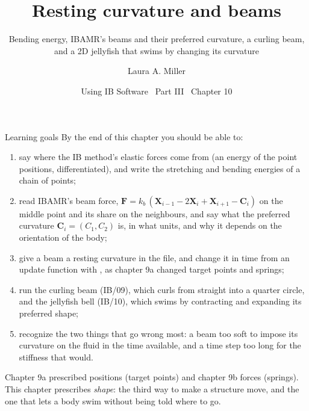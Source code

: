 \documentclass[aspectratio=169,11pt]{beamer}
\title[Resting curvature and beams]{Resting curvature and beams}
\subtitle{Bending energy, IBAMR's beams and their preferred curvature, a curling beam, and a 2D jellyfish that swims by changing its curvature}
\author[Miller]{Laura A. Miller}
\institute[UArizona]{Department of Mathematics, University of Arizona}
\date{Using IB Software \textbullet\ Part III \textbullet\ Chapter 10}
\begin{document}
\begin{frame}[plain]
\end{frame}

\begin{frame}{Learning goals}
\label{fr:goals}
\footnotesize By the end of this chapter you should be able to:
\begin{enumerate}
  \item say where the IB method's elastic forces come from (an energy of the point positions, differentiated), and write the stretching and bending energies of a chain of points;
  \item read IBAMR's beam force, $\mathbf{F} = k_b\,(\mathbf{X}_{i-1} - 2\mathbf{X}_i + \mathbf{X}_{i+1} - \mathbf{C}_i)$ on the middle point and its share on the neighbours, and say what the preferred curvature $\mathbf{C}_i = (C_1, C_2)$ is, in what units, and why it depends on the orientation of the body;
  \item give a beam a resting curvature in the  file, and change it in time from an update function with , as chapter 9a changed target points and springs;
  \item run the curling beam (IB/09), which curls from straight into a quarter circle, and the jellyfish bell (IB/10), which swims by contracting and expanding its preferred shape;
  \item recognize the two things that go wrong most: a beam too soft to impose its curvature on the fluid in the time available, and a time step too long for the stiffness that would.
\end{enumerate}
\begin{punchbox}
\footnotesize Chapter 9a prescribed positions (target points) and chapter 9b forces (springs). This chapter prescribes \emph{shape}: the third way to make a structure move, and the one that lets a body swim without being told where to go.
\end{punchbox}
\end{frame}
\end{document}
